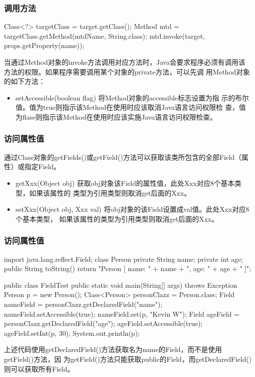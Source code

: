 \documentclass[hyperref={pdfpagelabels=false},compress,table]{beamer} %
\newcommand{\kai}{\CJKfamily{KaiTi}}
\def\Red{\color{red}}
\begin{document}
\begin{frame}[fragile] %
\frametitle{调用方法}
\begin{javaCode}
Class<?> targetClass = target.getClass();
Method mtd = targetClass.getMethod(mtdName, String.class);
mtd.invoke(target, props.getProperty(name));
\end{javaCode}

当通过Method对象的invoke方法调用对应方法时，Java会要求程序必须有调用该
方法的权限。{\Red 如果程序需要调用某个对象的private方法，可以先调
  用Method对象的如下方法}：

\begin{itemize}\kai
\item setAccessible(boolean flag) 将Method对象的accessible标志设置为指
  示的布尔值。值为true则指示该Method在使用时应该取消Java语言访问权限检
  查，值为flase则指示该Method在使用时应该实施Java语言访问权限检查。
\end{itemize}
\end{frame}

\begin{frame}[fragile] %
\frametitle{访问属性值}

通过Class对象的getFields()或getField()方法可以获取该类所包含的全部Field（属性）或指定Field。
\begin{itemize}\kai
\item getXxx(Object obj) 获取obj对象该Field的属性值，此处Xxx对应8个基本类型，如果该属性的
  类型为引用类型则取消get后面的Xxx。
\item setXxx(Object obj, Xxx val) 将obj对象的该Field设置成val值。此处Xxx对应8个基本类型，
  如果该属性的类型为引用类型则取消get后面的Xxx。
\end{itemize}
\end{frame}

\begin{frame}[fragile] %
\frametitle{访问属性值}
\begin{javaCode}
import java.lang.reflect.Field;
class Person{
  private String name;
  private int age;
  public String toString(){
    return "Person [ name: " + name + ", age: " + age + " ]"; 
  }
}

public class FieldTest {
  public static void main(String[] args) throws Exception {
    Person p = new Person();
    Class<Person> personClazz = Person.class;
    Field nameField = personClazz.getDeclaredField("name");
    nameField.setAccessible(true);
    nameField.set(p, "Kevin W");
    Field ageField = personClazz.getDeclaredField("age");
    ageField.setAccessible(true);
    ageField.setInt(p, 30);
    System.out.println(p);
  }
}
\end{javaCode}

上述代码使用getDeclaredField()方法获取名为name的Field，而不是使用getField()方法，因
为getField()方法只能获取public的Field，而getDeclaredField()则可以获取所有Field。
\end{frame}
\end{document}
